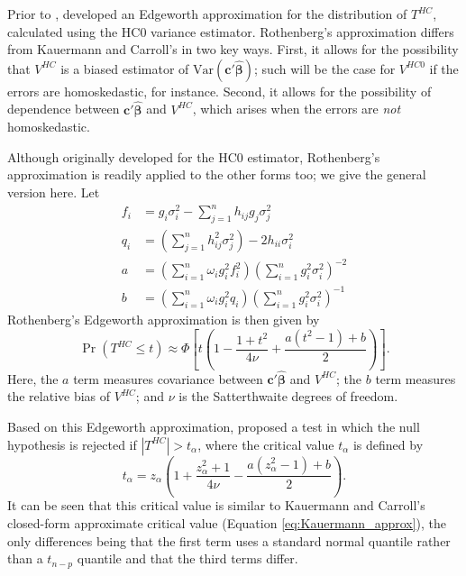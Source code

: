 \documentclass[12pt]{article}\usepackage[]{graphicx}\usepackage[]{color}
\newcommand{\Var}{\text{Var}}
\newcommand{\bm}{\mathbf}
\newcommand{\bs}{\boldsymbol}
\begin{document}
Prior to \citet{Kauermann2001note}, \citet{Rothenberg1988approximate} developed an Edgeworth approximation for the distribution of $T^{HC}$, calculated using the HC0 variance estimator. Rothenberg's approximation differs from Kauermann and Carroll's in two key ways. First, it allows for the possibility that $V^{HC}$ is a biased estimator of $\Var\left(\bm{c}'\bs{\hat\beta}\right)$; such will be the case for $V^{HC0}$ if the errors are homoskedastic, for instance. Second, it allows for the possibility of dependence between $\bm{c}'\bs{\hat\beta}$ and $V^{HC}$, which arises when the errors are \textit{not} homoskedastic.

Although originally developed for the HC0 estimator, Rothenberg's approximation is readily applied to the other forms too; we give the general version here. Let
\begin{align*}
f_i &= g_i \sigma_i^2 - \sum_{j=1}^n h_{ij} g_j \sigma_j^2 \\ 
q_i &= \left(\sum_{j=1}^n h_{ij}^2 \sigma_j^2 \right) - 2 h_{ii} \sigma_i^2 \\
a &= \left(\sum_{i=1}^n \omega_i g_i^2 f_i^2\right) \left(\sum_{i=1}^n g_i^2 \sigma_i^2\right)^{-2} \\
b &= \left(\sum_{i=1}^n \omega_i g_i^2 q_i\right) \left(\sum_{i=1}^n g_i^2 \sigma_i^2\right)^{-1}
\end{align*}
Rothenberg's Edgeworth approximation is then given by 
\[
\Pr\left(T^{HC} \leq t \right) \approx \Phi\left[t \left(1 - \frac{1 + t^2}{4 \nu} + \frac{a\left(t^2 - 1\right) + b}{2}\right)\right]. 
\]
Here, the $a$ term measures covariance between $\bm{c}'\bs{\hat\beta}$ and $V^{HC}$; the $b$ term measures the relative bias of $V^{HC}$; and $\nu$ is the Satterthwaite degrees of freedom. 

Based on this Edgeworth approximation, \citet{Rothenberg1988approximate} proposed a test in which the null hypothesis is rejected if $\left|T^{HC}\right| > t_{\alpha}$, where the critical value $t_{\alpha}$ is defined by 
\begin{equation}
\label{eq:edge_Roth}
t_\alpha = z_{\alpha}\left(1 + \frac{z_{\alpha}^2 + 1}{4 \nu} - \frac{a\left(z_{\alpha}^2 - 1\right) + b}{2}\right).
\end{equation}
It can be seen that this critical value is similar to Kauermann and Carroll's closed-form approximate critical value (Equation \ref{eq:Kauermann_approx}), the only differences being that the first term uses a standard normal quantile rather than a $t_{n - p}$ quantile and that the third terms differ. 
\end{document}
